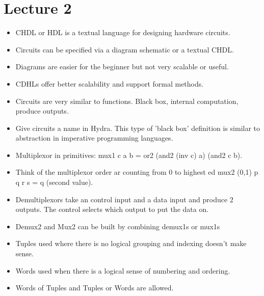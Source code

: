 \documentclass{article}
\begin{document}
\section*{Lecture 2}
\begin{itemize}
\item CHDL or HDL is a textual language for designing hardware circuits.
\item Circuits can be specified via a diagram schematic or a textual CHDL.
\item Diagrams are easier for the beginner but not very scalable or useful.
\item CDHLs offer better scalability and support formal methods.
\item Circuits are very similar to functions. Black box, internal computation, produce outputs.
\item Give circuits a name in Hydra. This type of 'black box' definition is similar to abstraction in imperative programming languages.
\item Multiplexor in primitives: mux1 c a b = or2 (and2 (inv c) a) (and2 c b).
\item Think of the multiplexor order ar counting from 0 to highest ed mux2 (0,1) p q r s = q (second value).
\item Demultiplexors take an control input and a data input and produce 2 outputs. The control selects which output to put the data on.
\item Demux2 and Mux2 can be built by combining demux1s or mux1s
\item Tuples used where there is no logical grouping and indexing doesn't make sense.
\item Words used when there is a logical sense of numbering and ordering.
\item Words of Tuples and Tuples or Words are allowed.
\end{itemize}
\end{document}
